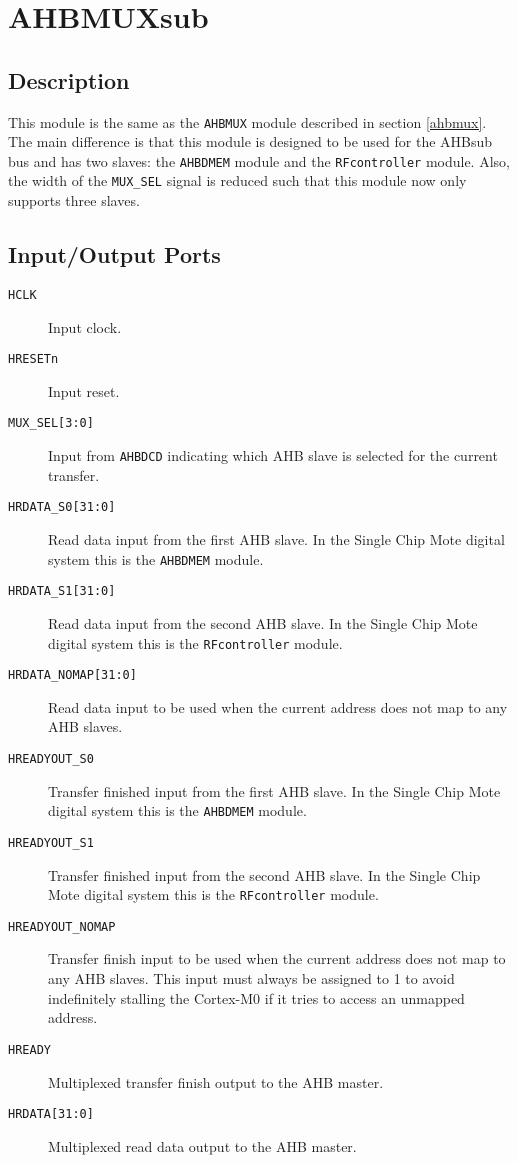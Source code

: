 \section{AHBMUXsub}
\subsection{Description}
This module is the same as the \texttt{AHBMUX} module described in section \ref{ahbmux}. The main difference is that this module is designed to be used for the AHBsub bus and has two slaves: the \texttt{AHBDMEM} module and the \texttt{RFcontroller} module. Also, the width of the \texttt{MUX\_SEL} signal is reduced such that this module now only supports three slaves.

\subsection{Input/Output Ports}
\begin{description}
	\item[\texttt{HCLK}] Input clock.
	\item[\texttt{HRESETn}] Input reset.
	\item[\texttt{MUX\_SEL[3:0]}] Input from \texttt{AHBDCD} indicating which AHB slave is selected for the current transfer.
	\item[\texttt{HRDATA\_S0[31:0]}] Read data input from the first AHB slave. In the Single Chip Mote digital system this is the \texttt{AHBDMEM} module.
	\item[\texttt{HRDATA\_S1[31:0]}] Read data input from the second AHB slave. In the Single Chip Mote digital system this is the \texttt{RFcontroller} module.
	\item[\texttt{HRDATA\_NOMAP[31:0]}] Read data input to be used when the current address does not map to any AHB slaves.
	\item[\texttt{HREADYOUT\_S0}] Transfer finished input from the first AHB slave. In the Single Chip Mote digital system this is the \texttt{AHBDMEM} module.
	\item[\texttt{HREADYOUT\_S1}] Transfer finished input from the second AHB slave. In the Single Chip Mote digital system this is the \texttt{RFcontroller} module.
	\item[\texttt{HREADYOUT\_NOMAP}] Transfer finish input to be used when the current address does not map to any AHB slaves. This input must always be assigned to 1 to avoid indefinitely stalling the Cortex-M0 if it tries to access an unmapped address.
	\item[\texttt{HREADY}] Multiplexed transfer finish output to the AHB master.
	\item[\texttt{HRDATA[31:0]}] Multiplexed read data output to the AHB master.
\end{description}


